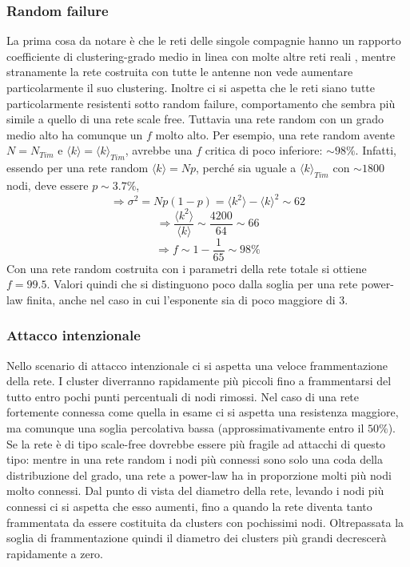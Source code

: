 \subsubsection{Random failure}
La prima cosa da notare è che le reti delle singole compagnie hanno un rapporto coefficiente di clustering-grado medio in linea con molte altre reti reali \parencite{Barbalbert2002}, mentre stranamente la rete costruita con tutte le antenne non vede aumentare particolarmente il suo clustering. Inoltre ci si aspetta che le reti siano tutte particolarmente resistenti sotto random failure, comportamento che sembra più simile a quello di una rete scale free. Tuttavia una rete random con un grado medio alto ha comunque un $f$ molto alto. Per esempio, una rete random avente $N = N_{Tim}$ e $\langle k \rangle = \langle k \rangle_{Tim}$, avrebbe una $f$ critica di poco inferiore: $\sim 98\%$. Infatti, essendo per una rete random $\langle k \rangle = Np$, perché sia uguale a $\langle k \rangle_{Tim}$ con $\sim 1800$ nodi, deve essere $p \sim 3.7\%$, 
$$\Rightarrow \sigma^2 = Np(1-p) = \langle k^2 \rangle - \langle k \rangle^2 \sim 62$$
$$\Rightarrow \frac{\langle k^2 \rangle }{\langle k \rangle} \sim \frac{4200}{64} \sim 66$$
$$\Rightarrow f \sim 1 - \frac{1}{65} \sim 98\%$$
Con una rete random costruita con i parametri della rete totale si ottiene $f = 99.5$. Valori quindi che si distinguono poco dalla soglia per una rete power-law finita, anche nel caso in cui l'esponente sia di poco maggiore di 3.


\subsubsection{Attacco intenzionale}
Nello scenario di attacco intenzionale ci si aspetta una veloce frammentazione della rete. I cluster diverranno rapidamente più piccoli fino a frammentarsi del tutto entro pochi punti percentuali di nodi rimossi. Nel caso di una rete fortemente connessa come quella in esame ci si aspetta una resistenza maggiore, ma comunque una soglia percolativa bassa (approssimativamente entro il $50\%$). Se la rete è di tipo scale-free dovrebbe essere più fragile ad attacchi di questo tipo: mentre in una rete random i nodi più connessi sono solo una coda della distribuzione del grado, una rete a power-law ha in proporzione molti più nodi molto connessi.
Dal punto di vista del diametro della rete, levando i nodi più connessi ci si aspetta che esso aumenti, fino a quando la rete diventa tanto frammentata da essere costituita da clusters con pochissimi nodi. Oltrepassata la soglia di frammentazione quindi il diametro dei clusters più grandi decrescerà rapidamente a zero.

